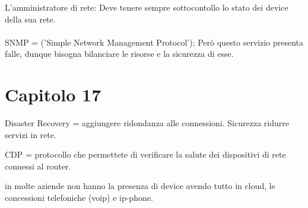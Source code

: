 \documentclass{article}
\begin{document}
L'amministratore di rete: Deve tenere sempre sottocontollo lo stato dei device della sua rete.
\\\\
SNMP = ('Simple Network Management Protocol');
Però questo servizio presenta falle, dunque bisogna bilanciare le risorse e la sicurezza di esse.

\section{Capitolo 17}

Disaster Recovery = aggiungere ridondanza alle connessioni.
Sicurezza ridurre servizi in rete.

CDP = protocollo che permettete di verificare la salute dei dispositivi di rete connessi al router.

in molte aziende non hanno la presenza di device avendo tutto in cloud, le concessioni telefoniche (voip) e ip-phone.
\end{document}
